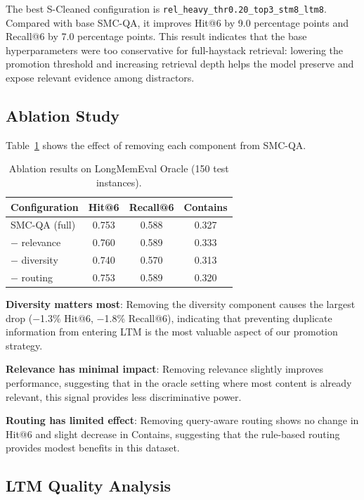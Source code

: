 \documentclass{article}
\begin{document}
The best S-Cleaned configuration is \texttt{rel\_heavy\_thr0.20\_top3\_stm8\_ltm8}. Compared with base SMC-QA, it improves Hit@6 by 9.0 percentage points and Recall@6 by 7.0 percentage points. This result indicates that the base hyperparameters were too conservative for full-haystack retrieval: lowering the promotion threshold and increasing retrieval depth helps the model preserve and expose relevant evidence among distractors.

\subsection{Ablation Study}

Table~\ref{tab:ablation} shows the effect of removing each component from SMC-QA.

\begin{table}[h]
\centering
\caption{Ablation results on LongMemEval Oracle (150 test instances).}
\label{tab:ablation}
\begin{tabular}{lccc}
\toprule
\textbf{Configuration} & \textbf{Hit@6} & \textbf{Recall@6} & \textbf{Contains} \\
\midrule
SMC-QA (full) & 0.753 & 0.588 & 0.327 \\
$-$ relevance & 0.760 & 0.589 & 0.333 \\
$-$ diversity & 0.740 & 0.570 & 0.313 \\
$-$ routing & 0.753 & 0.589 & 0.320 \\
\bottomrule
\end{tabular}
\end{table}

\textbf{Diversity matters most}: Removing the diversity component causes the largest drop ($-$1.3\% Hit@6, $-$1.8\% Recall@6), indicating that preventing duplicate information from entering LTM is the most valuable aspect of our promotion strategy.

\textbf{Relevance has minimal impact}: Removing relevance slightly improves performance, suggesting that in the oracle setting where most content is already relevant, this signal provides less discriminative power.

\textbf{Routing has limited effect}: Removing query-aware routing shows no change in Hit@6 and slight decrease in Contains, suggesting that the rule-based routing provides modest benefits in this dataset.

\subsection{LTM Quality Analysis}
\end{document}
